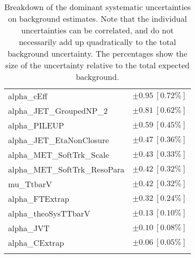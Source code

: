 \begin{table}
\begin{center}
\begin{tabular*}{\textwidth}{@{\extracolsep{\fill}}lc}
alpha\_cEff         & $\pm 0.95\ [0.72\%] $       \\
alpha\_JET\_GroupedNP\_2         & $\pm 0.81\ [0.62\%] $       \\
alpha\_PILEUP         & $\pm 0.59\ [0.45\%] $       \\
alpha\_JET\_EtaNonClosure         & $\pm 0.47\ [0.36\%] $       \\
alpha\_MET\_SoftTrk\_Scale         & $\pm 0.43\ [0.33\%] $       \\
alpha\_MET\_SoftTrk\_ResoPara         & $\pm 0.42\ [0.32\%] $       \\
mu\_TtbarV         & $\pm 0.42\ [0.32\%] $       \\
alpha\_FTExtrap         & $\pm 0.32\ [0.24\%] $       \\
alpha\_theoSysTTbarV         & $\pm 0.13\ [0.10\%] $       \\
alpha\_JVT         & $\pm 0.10\ [0.08\%] $       \\
alpha\_CExtrap         & $\pm 0.06\ [0.05\%] $       \\
\noalign{\smallskip}\hline\noalign{\smallskip}
\end{tabular*}
\end{center}
\caption[Breakdown of uncertainty on background estimates]{
Breakdown of the dominant systematic uncertainties on background estimates.
Note that the individual uncertainties can be correlated, and do not necessarily add up quadratically to 
the total background uncertainty. The percentages show the size of the uncertainty relative to the total expected background.
\label{table.results.bkgestimate.uncertainties.VRZAB}}
\end{table}
%